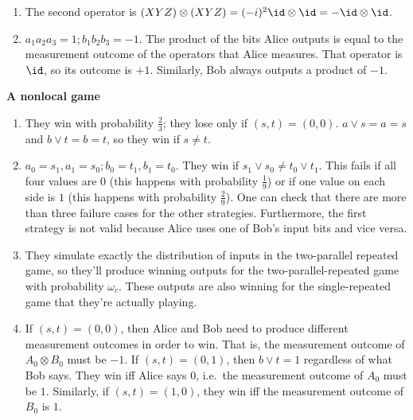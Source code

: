 \begin{exercises}
\begin{enumerate}
\item The second operator is $(XYZ)\otimes (XYZ) = (-i)^2\id\otimes \id = - \id\otimes \id$.

\item $a_1a_2a_3 = 1; b_1b_2b_3 = -1$. The product of the bits Alice outputs is equal to the measurement outcome of the operators that Alice measures. That operator is $\id$, so its outcome is $+1$. Similarly, Bob always outputs a product of $-1$.
\end{enumerate}


\item {\bf A nonlocal game}
\begin{enumerate}
\item They win with probability $\frac 23$; they lose only if $(s,t) = (0,0)$. $a\lor s = a = s$ and $b\lor t = b = t$, so they win if $s \neq t$.

\item $a_0 = s_1, a_1 = s_0; b_0 = t_1, b_1 = t_0$. They win if $s_1 \lor s_0 \neq t_0 \lor t_1$. This fails if all four values are $0$ (this happens with probability $\frac19$) or if one value on each side is $1$ (this happens with probability $\frac29$). One can check that there are more than three failure cases for the other strategies. Furthermore, the first strategy is not valid because Alice uses one of Bob's input bits and vice versa.

\item 
{}
They simulate exactly the distribution of inputs in the two-parallel repeated game, so they'll produce winning outputs for the two-parallel-repeated game with probability $\omega_c$. These outputs are also winning for the single-repeated game that they're actually playing.

\item 
{}
If $(s,t) = (0,0)$, then Alice and Bob need to produce different measurement outcomes in order to win. That is, the measurement outcome of $A_0\otimes B_0$ must be $-1$.
If $(s,t) = (0,1)$, then $b\lor t = 1$ regardless of what Bob says. They win iff Alice says $0$, i.e.\ the measurement outcome of $A_0$ must be $1$. Similarly, if $(s,t) = (1,0)$, they win iff the measurement outcome of $B_0$ is $1$.


\end{enumerate}
\end{exercises}
